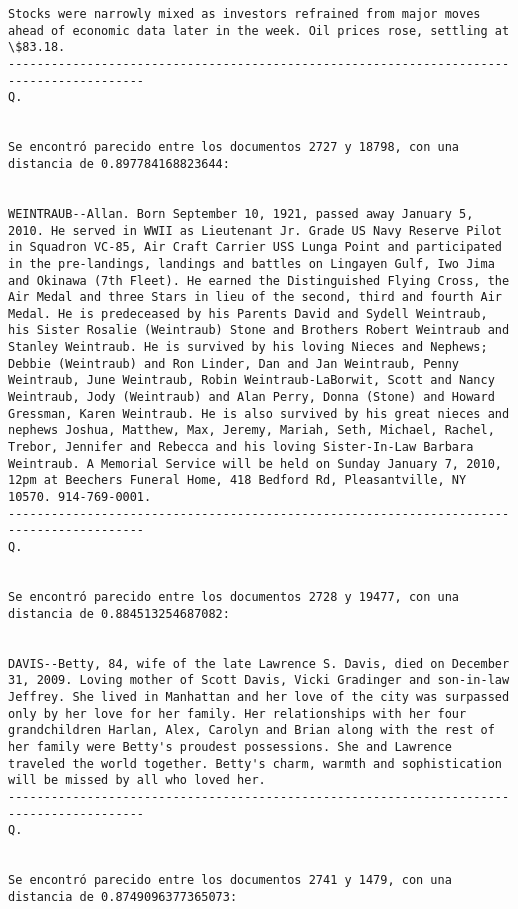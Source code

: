 \documentclass[11pt]{article}
\begin{document}
\begin{Verbatim}[commandchars=\\\{\}]
Stocks were narrowly mixed as investors refrained from major moves ahead of economic data later in the week. Oil prices rose, settling at \$83.18.
-----------------------------------------------------------------------------------------
Q.


Se encontró parecido entre los documentos 2727 y 18798, con una distancia de 0.897784168823644:


WEINTRAUB--Allan. Born September 10, 1921, passed away January 5, 2010. He served in WWII as Lieutenant Jr. Grade US Navy Reserve Pilot in Squadron VC-85, Air Craft Carrier USS Lunga Point and participated in the pre-landings, landings and battles on Lingayen Gulf, Iwo Jima and Okinawa (7th Fleet). He earned the Distinguished Flying Cross, the Air Medal and three Stars in lieu of the second, third and fourth Air Medal. He is predeceased by his Parents David and Sydell Weintraub, his Sister Rosalie (Weintraub) Stone and Brothers Robert Weintraub and Stanley Weintraub. He is survived by his loving Nieces and Nephews; Debbie (Weintraub) and Ron Linder, Dan and Jan Weintraub, Penny Weintraub, June Weintraub, Robin Weintraub-LaBorwit, Scott and Nancy Weintraub, Jody (Weintraub) and Alan Perry, Donna (Stone) and Howard Gressman, Karen Weintraub. He is also survived by his great nieces and nephews Joshua, Matthew, Max, Jeremy, Mariah, Seth, Michael, Rachel, Trebor, Jennifer and Rebecca and his loving Sister-In-Law Barbara Weintraub. A Memorial Service will be held on Sunday January 7, 2010, 12pm at Beechers Funeral Home, 418 Bedford Rd, Pleasantville, NY 10570. 914-769-0001.
-----------------------------------------------------------------------------------------
Q.


Se encontró parecido entre los documentos 2728 y 19477, con una distancia de 0.884513254687082:


DAVIS--Betty, 84, wife of the late Lawrence S. Davis, died on December 31, 2009. Loving mother of Scott Davis, Vicki Gradinger and son-in-law Jeffrey. She lived in Manhattan and her love of the city was surpassed only by her love for her family. Her relationships with her four grandchildren Harlan, Alex, Carolyn and Brian along with the rest of her family were Betty's proudest possessions. She and Lawrence traveled the world together. Betty's charm, warmth and sophistication will be missed by all who loved her.
-----------------------------------------------------------------------------------------
Q.


Se encontró parecido entre los documentos 2741 y 1479, con una distancia de 0.8749096377365073:



\end{Verbatim}
\end{document}

